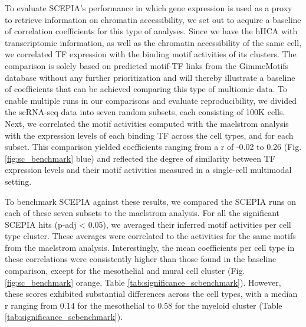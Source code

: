 To evaluate SCEPIA's performance in which gene expression is used as a proxy to retrieve information on chromatin accessibility, we set out to acquire a baseline of correlation coefficients for this type of analyses. Since we have the hHCA with transcriptomic information, as well as the chromatin accessibility of the same cell, we correlated TF expression with the binding motif activities of its clusters. The comparison is solely based on predicted motif-TF links from the GimmeMotifs database without any further prioritization and will thereby illustrate a baseline of coefficients that can be achieved comparing this type of multiomic data. To enable multiple runs in our comparisons and evaluate reproducibility, we divided the scRNA-seq data into seven random subsets, each consisting of 100K cells. Next, we correlated the motif activities computed with the maelstrom analysis with the expression levels of each binding TF across the cell types, and for each subset. This comparison yielded coefficients ranging from a r of -0.02 to 0.26 (Fig. \ref{fig:sc_benchmark} blue) and reflected the degree of similarity between TF expression levels and their motif activities measured in a single-cell multimodal setting.

To benchmark SCEPIA against these results, we compared the SCEPIA runs on each of these seven subsets to the maelstrom analysis. For all the significant SCEPIA hits (p-adj < 0.05), we averaged their inferred motif activities per cell type cluster. These averages were correlated to the activities for the same motifs from the maelstrom analysis. Interestingly, the mean coefficients per cell type in these correlations were consistently higher than those found in the baseline comparison, except for the mesothelial and mural cell cluster (Fig. \ref{fig:sc_benchmark} orange, Table \ref{tab:significance_scbenchmark}). However, these scores exhibited substantial differences across the cell types, with a median r ranging from 0.14 for the mesothelial to 0.58 for the myeloid cluster (Table \ref{tab:significance_scbenchmark}).

